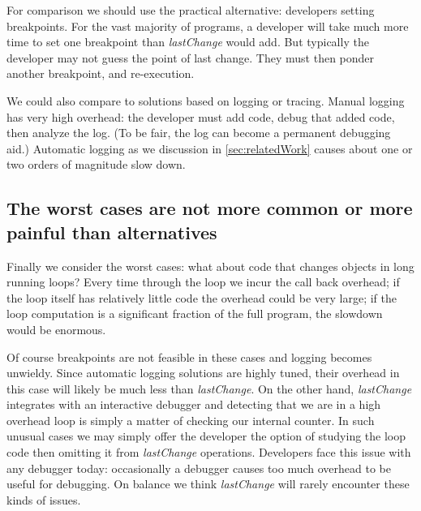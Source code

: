 \documentclass[runningheads,a4paper]{llncs}
\begin{document}
For comparison we should use the practical alternative: developers
setting breakpoints. For the vast majority of programs, a developer
will take much more time to set one breakpoint than
\textit{lastChange} would add. But typically the developer may not
guess the point of last change. They must then ponder another
breakpoint, and re-execution. 

We could also compare to solutions based on logging or tracing. Manual
logging has very high overhead: the developer must add code, debug
that added code, then analyze the log. (To be fair, the log can become
a permanent debugging aid.) Automatic logging as we discussion in
\ref{sec:relatedWork} causes about one or two orders of magnitude slow down. 

\subsection{The worst cases are not more common or more painful than alternatives}

Finally we consider the worst cases: what about code that changes
objects in long running loops? Every time through the loop we incur
the call back overhead; if the loop itself has relatively little code
the overhead could be very large; if the loop computation is a
significant fraction of the full program, the slowdown would be
enormous. 

Of course breakpoints are not feasible in these cases and logging
becomes unwieldy. Since automatic logging solutions are highly tuned,
their overhead in this case will likely be much less than
\textit{lastChange}. On the other hand, \textit{lastChange} integrates
with an interactive debugger and detecting that we are in a high
overhead loop is simply a matter of checking our internal counter. In
such unusual cases we may simply offer the developer the option of
studying the loop code then omitting it from \textit{lastChange}
operations. Developers face this issue with any debugger today: occasionally a
debugger causes too much overhead to be useful for debugging. On
balance we think \textit{lastChange} will rarely encounter these kinds
of issues.


\end{document}
